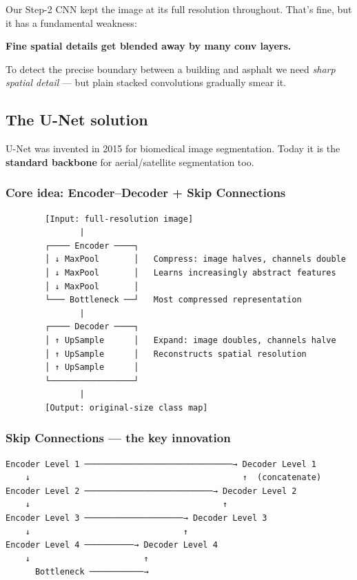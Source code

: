 \documentclass[11pt]{article}
\begin{document}
Our Step-2 CNN kept the image at its full resolution throughout. That's
fine, but it has a fundamental weakness:

\textbf{Fine spatial details get blended away by many conv layers.}

To detect the precise boundary between a building and asphalt we need
\emph{sharp spatial detail} --- but plain stacked convolutions gradually
smear it.

\subsection{The U-Net solution}\label{the-u-net-solution}

U-Net was invented in 2015 for biomedical image segmentation. Today it
is the \textbf{standard backbone} for aerial/satellite segmentation too.

\subsubsection{Core idea: Encoder--Decoder + Skip
Connections}\label{core-idea-encoderdecoder-skip-connections}

\begin{verbatim}
        [Input: full-resolution image]
               |
        ┌──── Encoder ────┐
        │ ↓ MaxPool       │   Compress: image halves, channels double
        │ ↓ MaxPool       │   Learns increasingly abstract features
        │ ↓ MaxPool       │
        └─── Bottleneck ──┘   Most compressed representation
               |
        ┌──── Decoder ────┐
        │ ↑ UpSample      │   Expand: image doubles, channels halve
        │ ↑ UpSample      │   Reconstructs spatial resolution
        │ ↑ UpSample      │
        └─────────────────┘
               |
        [Output: original-size class map]
\end{verbatim}

\subsubsection{Skip Connections --- the key
innovation}\label{skip-connections-the-key-innovation}

\begin{verbatim}
Encoder Level 1 ──────────────────────────────→ Decoder Level 1
    ↓                                           ↑  (concatenate)
Encoder Level 2 ──────────────────────────→ Decoder Level 2
    ↓                                       ↑
Encoder Level 3 ────────────────────→ Decoder Level 3
    ↓                               ↑
Encoder Level 4 ──────────→ Decoder Level 4
    ↓                       ↑
      Bottleneck ───────────→
\end{verbatim}
\end{document}

